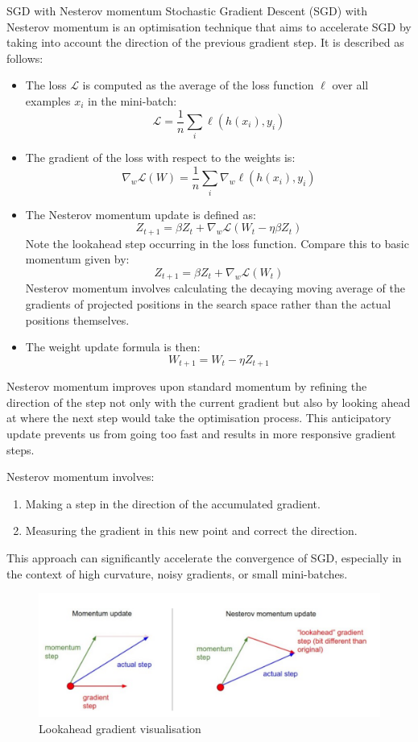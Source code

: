 \begin{definitionbox}{SGD with Nesterov momentum}
Stochastic Gradient Descent (SGD) with Nesterov momentum is an optimisation technique that aims to accelerate SGD by taking into account the direction of the previous gradient step. It is described as follows:
\begin{itemize}
    \item The loss \( \mathcal{L} \) is computed as the average of the loss function \( \ell \) over all examples \( x_i \) in the mini-batch:
    \[ \mathcal{L} = \frac{1}{n} \sum_{i} \ell(h(x_i), y_i) \]
    \item The gradient of the loss with respect to the weights is:
    \[ \nabla_w \mathcal{L}(W) = \frac{1}{n} \sum_{i} \nabla_w \ell(h(x_i), y_i) \]
    \item The Nesterov momentum update is defined as:
    \[ Z_{t+1} = \beta Z_t + \nabla_w \mathcal{L}(W_t - \eta\beta Z_t) \]
    Note the lookahead step occurring in the loss function. Compare this to basic momentum given by:
    \[ Z_{t+1} = \beta Z_{t} + \nabla_w \mathcal{L}(W_t) \]
    Nesterov momentum involves calculating the decaying moving average of the gradients of projected positions in the search space rather than the actual positions themselves.


    \item The weight update formula is then:
    \[ W_{t+1} = W_t - \eta Z_{t+1} \]
\end{itemize}
Nesterov momentum improves upon standard momentum by refining the direction of the step not only with the current gradient but also by looking ahead at where the next step would take the optimisation process. This anticipatory update prevents us from going too fast and results in more responsive gradient steps.

Nesterov momentum involves:
\begin{enumerate}
    \item Making a step in the direction of the accumulated gradient.
    \item Measuring the gradient in this new point and correct the direction.
\end{enumerate}
This approach can significantly accelerate the convergence of SGD, especially in the context of high curvature, noisy gradients, or small mini-batches.
\begin{figure}[H]
    \centering
    \includegraphics[width=0.7\linewidth]{img/nesterov.png}
    \caption{Lookahead gradient visualisation}
    
\end{figure}
\end{definitionbox}


